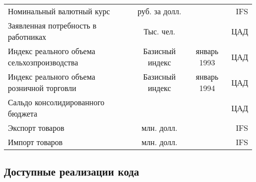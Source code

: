 \documentclass[11pt]{article} %
\begin{document}
\begin{landscape}
\begin{center}
\begin{table}[h!]
\begin{tabular}{lccr}
Номинальный валютный курс & руб. за долл. &  & IFS \\
Заявленная потребность в работниках & Тыс. чел. &  & ЦАД \\
Индекс реального объема сельхозпроизводства & Базисный индекс & январь 1993 & ЦАД\\
Индекс реального объема розничной торговли & Базисный индекс & январь 1994 & ЦАД\\
Сальдо консолидированного бюджета &  &  & ЦАД \\
Экспорт товаров & млн. долл. &  & IFS \\
Импорт товаров & млн. долл. &  & IFS \\
\end{tabular}
\end{table}
\end{center}
\end{landscape}
\newpage

\subsection*{Доступные реализации кода}
\end{document}
